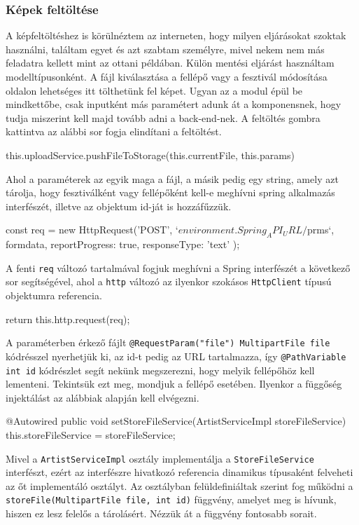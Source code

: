 \subsubsection{Képek feltöltése}
A képfeltöltéshez is körülnéztem az interneten, hogy milyen eljárásokat szoktak használni, találtam egyet és azt szabtam személyre, mivel nekem nem más feladatra kellett mint az ottani példában. Külön mentési eljárást használtam modelltípusonként. A fájl kiválasztása a fellépő vagy a fesztivál módosítása oldalon lehetséges itt tölthetünk fel képet. Ugyan az a modul épül be mindkettőbe, csak inputként más paramétert adunk át a komponensnek, hogy tudja miszerint kell majd tovább adni a back-end-nek. A feltöltés gombra kattintva az alábbi sor fogja elindítani a feltöltést.
\begin{java}
this.uploadService.pushFileToStorage(this.currentFile,
 this.params)
\end{java}
Ahol a paraméterek az egyik maga a fájl, a másik pedig egy string, amely azt tárolja, hogy fesztiválként vagy fellépőként kell-e meghívni spring alkalmazás interfészét, illetve az objektum id-ját is hozzáfűzzük.
\begin{java}
const req = new HttpRequest('POST', 
`${environment.Spring_API_URL}/${prms}`, formdata, {
      reportProgress: true,
      responseType: 'text'
    });
\end{java}
A fenti \texttt{req} változó tartalmával fogjuk meghívni a Spring interfészét a következő sor segítségével, ahol a \texttt{http} változó az ilyenkor szokásos \texttt{HttpClient} típusú objektumra referencia. 
\begin{java}
return this.http.request(req);
\end{java}
A paraméterben érkező fájlt \texttt{@RequestParam("file") MultipartFile file} kódrésszel nyerhetjük ki, az id-t pedig az URL tartalmazza, így \texttt{@PathVariable int id} kódrészlet segít nekünk megszerezni, hogy melyik fellépőhöz kell lementeni.
Tekintsük ezt meg, mondjuk a fellépő esetében. Ilyenkor a függőség injektálást az alábbiak alapján kell elvégezni.
\begin{java}
@Autowired
public void setStoreFileService(ArtistServiceImpl 
storeFileService) {
	this.storeFileService = storeFileService;
} 
\end{java}
Mivel a \texttt{ArtistServiceImpl} osztály implementálja a \texttt{StoreFileService} interfészt, ezért az interfészre hivatkozó referencia dinamikus típusaként felveheti az őt implementáló osztályt. Az osztályban felüldefiniáltak szerint fog működni a \texttt{storeFile(MultipartFile file, int id)} függvény, amelyet meg is hívunk, hiszen ez lesz felelős a tárolásért. Nézzük át a függvény fontosabb sorait.
